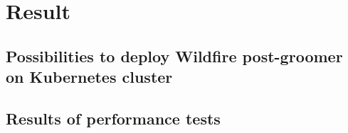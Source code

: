 
\chapter{Result}

\section{Possibilities to deploy Wildfire post-groomer on Kubernetes cluster}

\section{Results of performance tests}